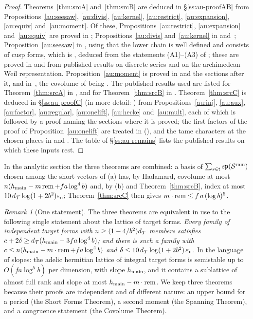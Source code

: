 \documentclass[10pt]{amsart}
\theoremstyle{definition}
\theoremstyle{remark}
\newtheorem{remark}[theorem]{Remark}
\begin{document}
\begin{proof}
Theorems~\ref{thm:srcA} and~\ref{thm:srcB} are deduced in \S\ref{ss:au-proofAB} from
Propositions~\ref{au:seesaw}, \ref{au:divis}, \ref{au:kernel}, \ref{au:restrict},
\ref{au:expansion}, \ref{au:equiv} and~\ref{au:moment}. Of these, Propositions~\ref{au:restrict},
\ref{au:expansion} and~\ref{au:equiv} are proved in {\cite[\S5.1]{P49}}; Propositions~\ref{au:divis}
and~\ref{au:kernel} in {\cite[\S\S4--7]{P49}} and~\cite{P50}; Proposition~\ref{au:seesaw} in
{\cite[\S\S5.1, 5.2 and~7]{P49}}, using that the lower chain is well defined
and consists of cusp forms, which is {\cite[Proposition~8.4]{P49}}, deduced from the statements
(A1)--(A3) of {\cite[\S8.1]{P49}}; these are proved in {\cite[\S3.1]{P49}} and {\cite[\S3.2]{P49}} from
published results on discrete series and on the archimedean Weil representation.
Proposition~\ref{au:moment} is proved in {\cite[\S2]{P51}} and the sections after it, and in~\cite{P52}, the covolume of
{\cite[Lemma~2.18]{P51}} being {\cite[Theorem~3.12]{P51}}. The published results used are listed for
Theorem~\ref{thm:srcA} in {\cite[\S8.4]{P49}}, and for Theorem~\ref{thm:srcB} in {\cite[\S2.8]{P51}}.
Theorem~\ref{thm:srcC} is deduced in \S\ref{ss:au-proofC} (in more detail:
{\cite[Proposition~2.2]{P53}}) from Propositions~\ref{au:inj}, \ref{au:aux}, \ref{au:factor},
\ref{au:regular}, \ref{au:onelift}, \ref{au:hecke} and~\ref{au:mult}, each of which is followed by
a proof naming the sections where it is proved; the first factors of the proof of
Proposition~\ref{au:onelift} are treated in {\cite[\S6]{P54}} ({\cite[Theorem~6.10]{P54}}), and the tame
characters at the chosen places in {\cite[Definition~6.14]{P54}} and {\cite[Proposition~6.15]{P54}}.
The table of \S\ref{ss:au-remains} lists the published results on which these inputs rest.
\end{proof}

In the analytic section the three theorems are combined: a basis of
$\sum_{s\in\mathsf t}s\mathfrak p(\mathcal S^{\mathrm{ram}})$ chosen among the short vectors of (a) has, by Hadamard, covolume at
most $n(h_{\mathrm{main}}-m\operatorname{rem}+fa\log^4b)$ and, by (b) and Theorem~\ref{thm:srcB}, index at most
$10\,d_{\mathcal T}\log(1+2b^2)\varepsilon_{\mathrm u}$; Theorem~\ref{thm:srcC} then gives $m\cdot\operatorname{rem}\le f\,a\,(\log b)^5$.

\begin{remark}[One statement]\label{au:merged}
The three theorems are equivalent in use to the following single statement about the lattice of
target forms. \emph{Every family of independent target forms with $n\ge(1-4/b^2)d_{\mathcal T}$ members
satisfies $c+2\delta\ge d_{\mathcal T}(h_{\mathrm{main}}-3fa\log^4b)$; and there is such a family with
$c\le n(h_{\mathrm{main}}-m\cdot\operatorname{rem}+fa\log^4b)$ and $\delta\le10\,d_{\mathcal T}\log(1+2b^2)\,\varepsilon_{\mathrm u}$.} In the
language of slopes: the adelic hermitian lattice of integral target forms is semistable up to
$O(fa\log^5b)$ per dimension, with slope $h_{\mathrm{main}}$, and it contains a sublattice of almost full
rank and slope at most $h_{\mathrm{main}}-m\cdot\operatorname{rem}$. We keep three theorems because their proofs are
independent and of different nature: an upper bound for a period (the Short Forms Theorem), a second moment (the Spanning
Theorem), and a congruence statement (the Covolume Theorem).
\end{remark}
\end{document}
